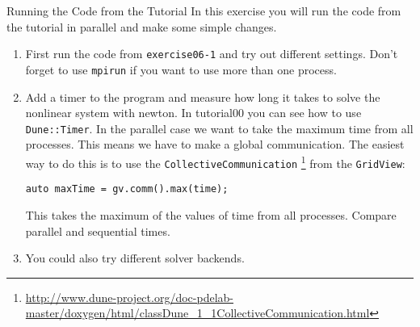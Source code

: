 \documentclass[12pt,a4paper]{article}
\begin{document}
\begin{Exercise}{Running the Code from the Tutorial}
  In this exercise you will run the code from the tutorial in parallel
  and make some simple changes.
  \begin{enumerate}
  \item First run the code from \lstinline{exercise06-1} and try out
    different settings. Don't forget to use \lstinline{mpirun} if you
    want to use more than one process.
  \item Add a timer to the program and measure how long it takes to
    solve the nonlinear system with newton. In tutorial00 you can see
    how to use \lstinline{Dune::Timer}. In the parallel case we want
    to take the maximum time from all processes. This means we have to
    make a global communication. The easiest way to do this is to use
    the \lstinline{CollectiveCommunication}
    \footnote{\href{http://www.dune-project.org/doc-pdelab-master/doxygen/html/classDune\_1\_1CollectiveCommunication.html}{http://www.dune-project.org/doc-pdelab-master/doxygen/html/classDune\_1\_1CollectiveCommunication.html}}
    from the \lstinline{GridView}:
    \begin{lstlisting}
auto maxTime = gv.comm().max(time);
    \end{lstlisting}
    This takes the maximum of the values of time from all
    processes. Compare parallel and sequential times.
  \item You could also try different solver backends.
  \end{enumerate}
\end{Exercise}
\end{document}
